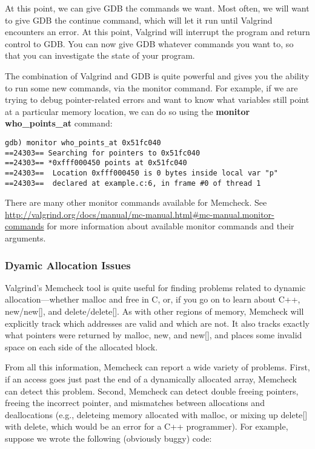 \documentclass[11pt, a4paper]{article}
\begin{document}
At this point, we can give GDB the commands we want. Most often, we will want to give GDB the continue command, which will let it run until Valgrind encounters an error. At this point, Valgrind will interrupt the program and return control to GDB. You can now give GDB whatever commands you want to, so that you can investigate the state of your program.

The combination of Valgrind and GDB is quite powerful and gives you the ability to run some new commands, via the monitor command. For example, if we are trying to debug pointer-related errors and want to know what variables still point at a particular memory location, we can do so using the \textbf{monitor who\_points\_at} command:

\begin{verbatim}
gdb) monitor who_points_at 0x51fc040
==24303== Searching for pointers to 0x51fc040
==24303== *0xfff000450 points at 0x51fc040
==24303==  Location 0xfff000450 is 0 bytes inside local var "p"
==24303==  declared at example.c:6, in frame #0 of thread 1 
\end{verbatim}



There are many other monitor commands available for Memcheck. See \url{http://valgrind.org/docs/manual/mc-manual.html\#mc-manual.monitor-commands} for more information about available monitor commands and their arguments.


\subsubsection{Dyamic Allocation Issues}%
\label{ssub:dyamic_allocation_issues}



Valgrind's Memcheck tool is quite useful for finding problems related to dynamic allocation—whether malloc and free in C, or, if you go on to learn about C++, new/new[], and delete/delete[]. As with other regions of memory, Memcheck will explicitly track which addresses are valid and which are not. It also tracks exactly what pointers were returned by malloc, new, and new[], and places some invalid space on each side of the allocated block.

From all this information, Memcheck can report a wide variety of problems. First, if an access goes just past the end of a dynamically allocated array, Memcheck can detect this problem. Second, Memcheck can detect double freeing pointers, freeing the incorrect pointer, and mismatches between allocations and deallocations (e.g., deleteing memory allocated with malloc, or mixing up delete[] with delete, which would be an error for a C++ programmer). For example, suppose we wrote the following (obviously buggy) code:
\end{document}

